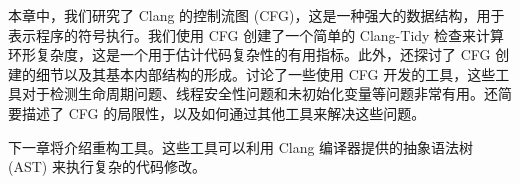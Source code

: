 本章中，我们研究了 Clang 的控制流图 (CFG)，这是一种强大的数据结构，用于表示程序的符号执行。我们使用 CFG 创建了一个简单的 Clang-Tidy 检查来计算环形复杂度，这是一个用于估计代码复杂性的有用指标。此外，还探讨了 CFG 创建的细节以及其基本内部结构的形成。讨论了一些使用 CFG 开发的工具，这些工具对于检测生命周期问题、线程安全性问题和未初始化变量等问题非常有用。还简要描述了 CFG 的局限性，以及如何通过其他工具来解决这些问题。

下一章将介绍重构工具。这些工具可以利用 Clang 编译器提供的抽象语法树 (AST) 来执行复杂的代码修改。
